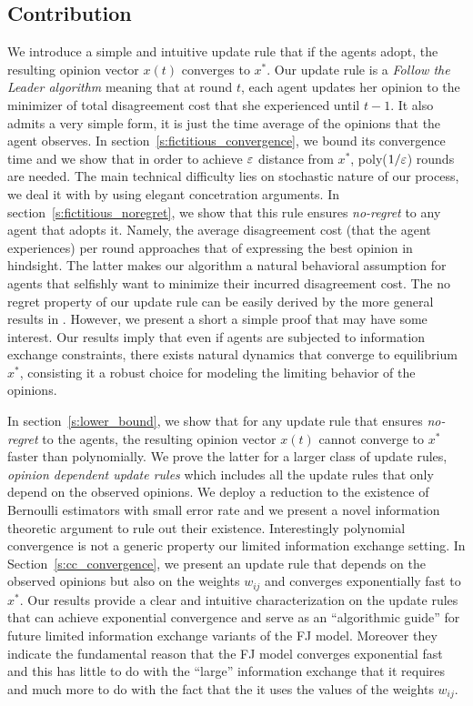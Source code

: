 \subsection{Contribution}
We introduce a simple and intuitive update rule that if the agents adopt,
the resulting opinion vector $x(t)$ converges to $x^*$.
Our update rule is a \emph{Follow the Leader algorithm}
meaning that at round $t$, each agent updates her opinion
to the minimizer of total disagreement cost that
she experienced until $t-1$. It also admits a very simple form,
it is just the time average of the opinions that the agent observes.
In section~\ref{s:fictitious_convergence},
we bound its convergence time and we show that in order
to achieve $\varepsilon$ distance from $x^*$, poly($1/\varepsilon$) rounds
are needed. The main technical difficulty lies on stochastic nature
of our process, we deal it with by using elegant concetration arguments.
In section~\ref{s:fictitious_noregret},
we show that this rule ensures \emph{no-regret} to any agent
that adopts it. Namely, the average disagreement cost (that
the agent experiences) per round approaches that
of expressing the best opinion in hindsight. The latter
makes our algorithm a natural behavioral assumption for
agents that selfishly want to minimize their incurred disagreement cost.
The no regret property of our update rule can be easily derived by the
more general results in \cite{HAK07}. However, we present a short a simple
proof that may have some interest. Our results imply that even 
if agents are subjected to information exchange constraints, there exists natural
dynamics that converge to equilibrium $x^*$, consisting it
a robust choice for modeling the limiting behavior of the opinions.

In section~\ref{s:lower_bound}, we show
that for any update rule that ensures \emph{no-regret}
to the agents, the resulting opinion vector $x(t)$
cannot converge to $x^*$ faster than polynomially.
We prove the latter for a larger class of update rules,
\emph{opinion dependent update rules} which includes
all the update rules that only depend on the observed
opinions. We deploy a reduction to the existence of
Bernoulli estimators with small error rate and we present
a novel information theoretic argument to rule out their
existence. Interestingly polynomial convergence is not a
generic property our limited information exchange setting.
In Section~\ref{s:cc_convergence}, we present an update rule
that depends on the observed opinions but also on the weights
$w_{ij}$ and converges exponentially fast to $x^*$. Our results
provide a clear and intuitive characterization on the update
rules that can achieve exponential convergence and serve as
an \enquote{algorithmic guide} for future limited information exchange
variants of the FJ model. Moreover they indicate the fundamental reason that
the FJ model converges exponential fast and this has little
to do with the \enquote{large} information exchange
that it requires and much more to do with the fact that
the it uses the values of the weights $w_{ij}$.

